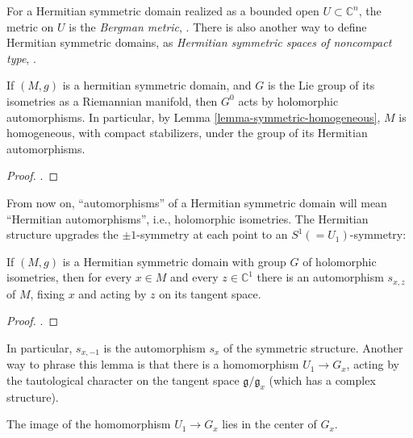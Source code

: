 \begin{remark}
 \label{remark-Bergman-metric}
For a Hermitian symmetric domain realized as a bounded open $U\subset \mathbb C^n$, the metric on $U$ is the {\it Bergman metric}, \cite[Theorem 1.3]{Milne-Shimura}. There is also another way to define Hermitian symmetric domains, as {\it Hermitian symmetric spaces of noncompact type}, \cite[\S 1]{Milne-Shimura}.
\end{remark}


\begin{lemma}
 \label{lemma-hermitian-homogeneous}
If $(M,g)$ is a hermitian symmetric domain, and $G$ is the Lie group of its isometries as a Riemannian manifold, then $G^0$ acts by holomorphic automorphisms. In particular, by Lemma \ref{lemma-symmetric-homogeneous}, $M$ is homogeneous, with compact stabilizers, under the group of its Hermitian automorphisms.
\end{lemma}

\begin{proof}
 \cite[Proposition 1.6]{Milne-Shimura}.
\end{proof}

From now on, ``automorphisms'' of a Hermitian symmetric domain will mean ``Hermitian automorphisms'', i.e., holomorphic isometries.
The Hermitian structure upgrades the $\pm 1$-symmetry at each point to an $S^1(=U_1)$-symmetry:

\begin{lemma}
 \label{lemma-S1-symmetry}
If $(M,g)$ is a Hermitian symmetric domain with group $G$ of holomorphic isometries, then for every $x\in M$ and every $z\in \mathbb C^1$ there is an automorphism $s_{x,z}$ of $M$, fixing $x$ and acting by $z$ on its tangent space.
\end{lemma}

\begin{proof}
 \cite[Theorem 1.9]{Milne-Shimura}.
\end{proof}


In particular, $s_{x,-1}$ is the automorphism $s_x$ of the symmetric structure. Another way to phrase this lemma is that there is a homomorphism $U_1\to G_x$, acting by the tautological character on the tangent space $\mathfrak g/\mathfrak g_x$ (which has a complex structure). 

\begin{lemma}
 \label{lemma-cocharacter-in-center}
The image of the homomorphism $U_1\to G_x$ lies in the center of $G_x$.
\end{lemma}

